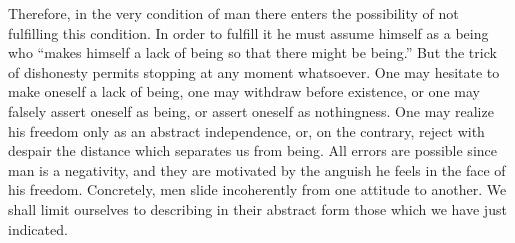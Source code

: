 \documentclass[11pt]{article}
\begin{document}
Therefore, in the very condition of man there enters the possibility of not fulfilling this condition. In order to fulfill it he must assume himself as a being who “makes himself a lack of being so that there might be being.” But the trick of dishonesty permits stopping at any moment whatsoever. One may hesitate to make oneself a lack of being, one may withdraw before existence, or one may falsely assert oneself as being, or assert oneself as nothingness. One may realize his freedom only as an abstract independence, or, on the contrary, reject with despair the distance which separates us from being. All errors are possible since man is a negativity, and they are motivated by the anguish he feels in the face of his freedom. Concretely, men slide incoherently from one attitude to another. We shall limit ourselves to describing in their abstract form those which we have just indicated.
\pagebreak
\end{document}

